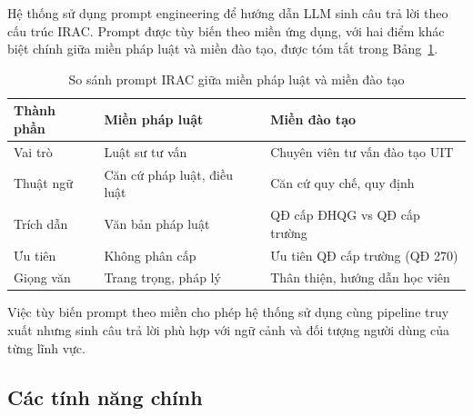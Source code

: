 Hệ thống sử dụng prompt engineering để hướng dẫn LLM sinh câu trả lời theo cấu
trúc IRAC. Prompt được tùy biến theo miền ứng dụng, với hai điểm khác biệt chính giữa
miền pháp luật và miền đào tạo, được tóm tắt trong Bảng~\ref{tab:irac-compare}.

\begin{table}[htbp]
  \centering
  \caption{So sánh prompt IRAC giữa miền pháp luật và miền đào tạo}
  \label{tab:irac-compare}
  \begin{tabular}{lll}
    \toprule
    \textbf{Thành phần} & \textbf{Miền pháp luật} & \textbf{Miền đào tạo} \\
    \midrule
    Vai trò    & Luật sư tư vấn               & Chuyên viên tư vấn đào tạo UIT \\
    Thuật ngữ  & Căn cứ pháp luật, điều luật  & Căn cứ quy chế, quy định \\
    Trích dẫn  & Văn bản pháp luật            & QĐ cấp ĐHQG vs QĐ cấp trường \\
    Ưu tiên    & Không phân cấp               & Ưu tiên QĐ cấp trường (QĐ 270) \\
    Giọng văn  & Trang trọng, pháp lý         & Thân thiện, hướng dẫn học viên \\
    \bottomrule
  \end{tabular}
\end{table}

Việc tùy biến prompt theo miền cho phép hệ thống sử dụng cùng pipeline truy xuất
nhưng sinh câu trả lời phù hợp với ngữ cảnh và đối tượng người dùng của từng lĩnh vực.

\subsection{Các tính năng chính}
\label{subsec:tinh-nang-chinh}

